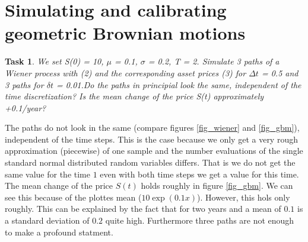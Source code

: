 \documentclass{scrartcl}
\newtheorem{task}{Task}
\begin{document}
	\section*{Simulating and calibrating geometric Brownian motions}
	\begin{task}
		We set S(0) = 10, $\mu$ = 0.1, $\sigma$ = 0.2, T = 2. Simulate 3 paths of a Wiener process with (2)
		and the corresponding asset prices (3) for $\Delta t$ = 0.5 and 3 paths for $\delta t$ = 0.01.Do the paths in principial look the same, independent of the time discretization? Is the
		mean change of the price S(t) approximately +0.1/year?
	\end{task}
	The paths do not look in the same (compare figures \ref{fig_wiener} and \ref{fig_gbm}), independent of the time steps. This is the case because we only get a very rough approximation (piecewise) of one sample and the number evaluations of the single standard normal distributed random variables differs. That is we do not get the same value for the time $1$ even with both time steps we get a value for this time. \\
	The mean change of the price $S(t)$ holds roughly in figure \ref{fig_gbm}. We can see this because of the plottes mean ($10\exp(0.1  x)$). However, this hols only roughly. This can be explained by the fact that for two years and a mean of $0.1$ is a standard deviation of $0.2$ quite high. Furthermore three paths are not enough to make a profound statment. 
	
\end{document}
